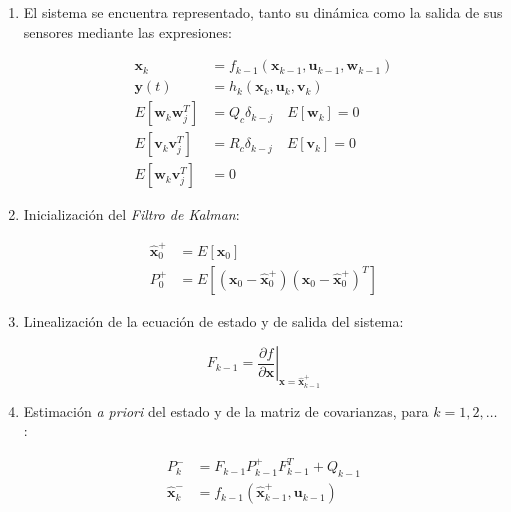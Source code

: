\begin{enumerate}

\item El sistema se encuentra representado, tanto su dinámica como la salida de sus sensores mediante las expresiones:

\begin{equation}
\begin{split}
	\boldsymbol{x}_k &= f_{k-1}(\boldsymbol{x}_{k-1},\boldsymbol{u}_{k-1},\boldsymbol{w}_{k-1}) \\
	\boldsymbol{y}(t) &= h_k(\boldsymbol{x}_k,\boldsymbol{u}_k,\boldsymbol{v}_k) \\
	E[\boldsymbol{w}_k\boldsymbol{w}_j^T] &= Q_c \delta_{k-j} \quad E[\boldsymbol{w}_k] = 0 \\
	E[\boldsymbol{v}_k\boldsymbol{v}_j^T] &= R_c \delta_{k-j} \quad E[\boldsymbol{v}_k] = 0 \\
	E[\boldsymbol{w}_k\boldsymbol{v}_j^T] &= 0
\end{split}
\end{equation}

\item Inicialización del \emph{Filtro de Kalman}:

\begin{equation}
\begin{split}
	\boldsymbol{\hat{x}}_0^{+} &= E[\boldsymbol{x}_0] \\
	P_0^{+} &= E[(\boldsymbol{x}_0 - \boldsymbol{\hat{x}}_0^{+}) (\boldsymbol{x}_0 - \boldsymbol{\hat{x}}_0^{+})^T]
\end{split}
\end{equation}

\item Linealización de la ecuación de estado y de salida del sistema:

\begin{equation}
	F_{k-1} = \left.\frac{\partial f}{\partial\boldsymbol{x}} \right|_{\boldsymbol{x} = \boldsymbol{\hat{x}}_{k-1}^{+}}
\end{equation}

\item Estimación \emph{a priori} del estado y de la matriz de covarianzas, para $k = 1,2, \ldots$ : 

\begin{equation}
\begin{split}
	P_k^{-} &= F_{k-1}P_{k-1}^{+}F_{k-1}^T + Q_{k-1} \\
	\boldsymbol{\hat{x}}_k^{-} &= f_{k-1}(\boldsymbol{\hat{x}}_{k-1}^{+},\boldsymbol{u}_{k-1})
\end{split}
\end{equation} 


\end{enumerate}
